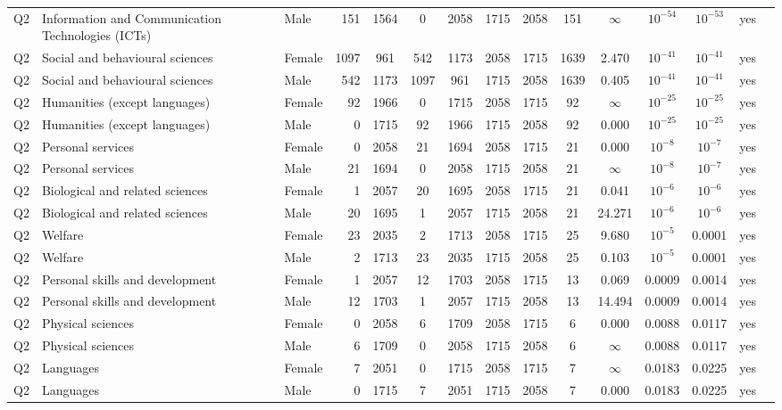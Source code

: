 \begin{longtable}{lllrcccccccccll}
Q2 & Information and Communication Technologies (ICTs) & Male & 151 & 1564 & 0 & 2058 & 1715 & 2058 & 151 & $\infty$ & $10^{-54}$ & $10^{-53}$ & yes \\
Q2 & Social and behavioural sciences & Female & 1097 & 961 & 542 & 1173 & 2058 & 1715 & 1639 & 2.470 & $10^{-41}$ & $10^{-41}$ & yes \\
Q2 & Social and behavioural sciences & Male & 542 & 1173 & 1097 & 961 & 1715 & 2058 & 1639 & 0.405 & $10^{-41}$ & $10^{-41}$ & yes \\
Q2 & Humanities (except languages) & Female & 92 & 1966 & 0 & 1715 & 2058 & 1715 & 92 & $\infty$ & $10^{-25}$ & $10^{-25}$ & yes \\
Q2 & Humanities (except languages) & Male & 0 & 1715 & 92 & 1966 & 1715 & 2058 & 92 & 0.000 & $10^{-25}$ & $10^{-25}$ & yes \\
Q2 & Personal services & Female & 0 & 2058 & 21 & 1694 & 2058 & 1715 & 21 & 0.000 & $10^{-8}$ & $10^{-7}$ & yes \\
Q2 & Personal services & Male & 21 & 1694 & 0 & 2058 & 1715 & 2058 & 21 & $\infty$ & $10^{-8}$ & $10^{-7}$ & yes \\
Q2 & Biological and related sciences & Female & 1 & 2057 & 20 & 1695 & 2058 & 1715 & 21 & 0.041 & $10^{-6}$ & $10^{-6}$ & yes \\
Q2 & Biological and related sciences & Male & 20 & 1695 & 1 & 2057 & 1715 & 2058 & 21 & 24.271 & $10^{-6}$ & $10^{-6}$ & yes \\
Q2 & Welfare & Female & 23 & 2035 & 2 & 1713 & 2058 & 1715 & 25 & 9.680 & $10^{-5}$ & 0.0001 & yes \\
Q2 & Welfare & Male & 2 & 1713 & 23 & 2035 & 1715 & 2058 & 25 & 0.103 & $10^{-5}$ & 0.0001 & yes \\
Q2 & Personal skills and development & Female & 1 & 2057 & 12 & 1703 & 2058 & 1715 & 13 & 0.069 & 0.0009 & 0.0014 & yes \\
Q2 & Personal skills and development & Male & 12 & 1703 & 1 & 2057 & 1715 & 2058 & 13 & 14.494 & 0.0009 & 0.0014 & yes \\
Q2 & Physical sciences & Female & 0 & 2058 & 6 & 1709 & 2058 & 1715 & 6 & 0.000 & 0.0088 & 0.0117 & yes \\
Q2 & Physical sciences & Male & 6 & 1709 & 0 & 2058 & 1715 & 2058 & 6 & $\infty$ & 0.0088 & 0.0117 & yes \\
Q2 & Languages & Female & 7 & 2051 & 0 & 1715 & 2058 & 1715 & 7 & $\infty$ & 0.0183 & 0.0225 & yes \\
Q2 & Languages & Male & 0 & 1715 & 7 & 2051 & 1715 & 2058 & 7 & 0.000 & 0.0183 & 0.0225 & yes \\

\end{longtable}
